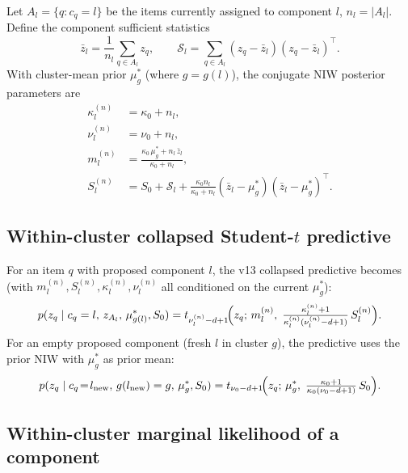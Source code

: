 \documentclass[11pt]{article}
\newcommand{\trans}{^{\top}}
\begin{document}
Let $A_l = \{q:c_q=l\}$ be the items currently assigned to component $l$,
$n_l=|A_l|$. Define the component sufficient statistics
\begin{equation}
\bar z_l = \frac{1}{n_l}\sum_{q\in A_l} z_q,
\qquad
\mathcal{S}_l = \sum_{q\in A_l}(z_q-\bar z_l)(z_q-\bar z_l)\trans.
\label{eq:suffstats}
\end{equation}
With cluster-mean prior $\mu_g^*$ (where $g=g(l)$), the conjugate NIW
posterior parameters are
\begin{align}
\kappa_l^{(n)} &= \kappa_0+n_l, \label{eq:kn}\\
\nu_l^{(n)}    &= \nu_0+n_l, \label{eq:nn}\\
m_l^{(n)}      &= \frac{\kappa_0\,\mu_g^* + n_l\,\bar z_l}{\kappa_0+n_l}, \label{eq:mn}\\
S_l^{(n)}      &= S_0 + \mathcal{S}_l + \frac{\kappa_0 n_l}{\kappa_0+n_l}
                   (\bar z_l-\mu_g^*)(\bar z_l-\mu_g^*)\trans. \label{eq:Sn}
\end{align}

\subsection{Within-cluster collapsed Student-$t$ predictive}
\label{sec:tpred}

For an item $q$ with proposed component $l$, the v13 collapsed predictive
becomes (with $m_l^{(n)},S_l^{(n)},\kappa_l^{(n)},\nu_l^{(n)}$ all
conditioned on the current $\mu_g^*$):
\begin{equation}
p(z_q\mid c_q=l,\,z_{A_l},\,\mu_{g(l)}^*,S_0)
 = t_{\nu_l^{(n)}-d+1}\!\Bigl(z_q;\,m_l^{(n)},\;
       \tfrac{\kappa_l^{(n)}+1}{\kappa_l^{(n)}(\nu_l^{(n)}-d+1)}\,S_l^{(n)}\Bigr).
\label{eq:tpred}
\end{equation}
For an empty proposed component (fresh $l$ in cluster $g$), the
predictive uses the prior NIW with $\mu_g^*$ as prior mean:
\begin{equation}
p(z_q\mid c_q\!=\!l_{\mathrm{new}},\,g(l_{\mathrm{new}})=g,\,\mu_g^*,S_0)
 = t_{\nu_0-d+1}\!\Bigl(z_q;\,\mu_g^*,\;
   \tfrac{\kappa_0+1}{\kappa_0(\nu_0-d+1)}\,S_0\Bigr).
\label{eq:tpred-empty}
\end{equation}

\subsection{Within-cluster marginal likelihood of a component}
\end{document}
